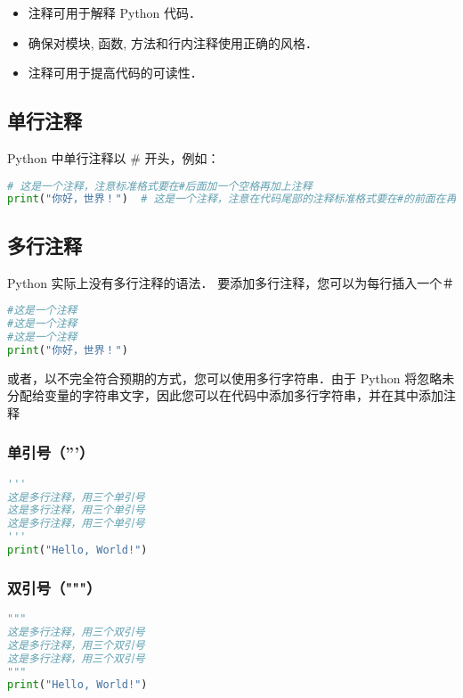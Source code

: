 
\begin{itemize}
\item 注释可用于解释 Python 代码．
\item 确保对模块, 函数, 方法和行内注释使用正确的风格．
\item 注释可用于提高代码的可读性．
\end{itemize}

\subsection{单行注释}
Python 中单行注释以 # 开头，例如：
\begin{lstlisting}[language=python]
# 这是一个注释，注意标准格式要在#后面加一个空格再加上注释
print("你好，世界！")  # 这是一个注释，注意在代码尾部的注释标准格式要在#的前面在再加两个空格
\end{lstlisting}

\subsection{多行注释}
Python 实际上没有多行注释的语法．
要添加多行注释，您可以为每行插入一个＃
\begin{lstlisting}[language=python]
#这是一个注释
#这是一个注释
#这是一个注释
print("你好，世界！")
\end{lstlisting}

或者，以不完全符合预期的方式，您可以使用多行字符串．由于 Python 将忽略未分配给变量的字符串文字，因此您可以在代码中添加多行字符串，并在其中添加注释
\subsubsection{单引号（'''）}
\begin{lstlisting}[language=python]
'''
这是多行注释，用三个单引号
这是多行注释，用三个单引号 
这是多行注释，用三个单引号
'''
print("Hello, World!")
\end{lstlisting}

\subsubsection{双引号（"""）}
\begin{lstlisting}[language=python]
"""
这是多行注释，用三个双引号
这是多行注释，用三个双引号 
这是多行注释，用三个双引号
"""
print("Hello, World!")
\end{lstlisting}

